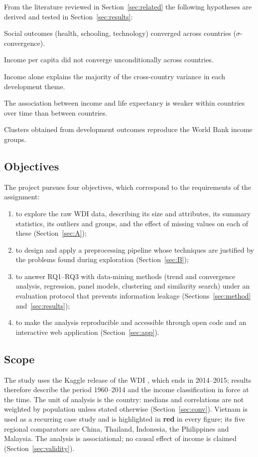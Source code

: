 \documentclass[11pt,a4paper]{article}
\begin{document}
From the literature reviewed in Section~\ref{sec:related} the following hypotheses are derived and tested in Section~\ref{sec:results}:
\begin{description}[leftmargin=1.2cm,style=nextline]
\item[H1] Social outcomes (health, schooling, technology) converged across countries ($\sigma$-convergence).
\item[H2] Income per capita did not converge unconditionally across countries.
\item[H3] Income alone explains the majority of the cross-country variance in each development theme.
\item[H4] The association between income and life expectancy is weaker within countries over time than between countries.
\item[H5] Clusters obtained from development outcomes reproduce the World Bank income groups.
\end{description}

\subsection{Objectives}
The project pursues four objectives, which correspond to the requirements of the assignment:
\begin{enumerate}
\item to explore the raw WDI data, describing its size and attributes, its summary statistics, its outliers and groups, and the effect of missing values on each of these (Section~\ref{sec:A});
\item to design and apply a preprocessing pipeline whose techniques are justified by the problems found during exploration (Section~\ref{sec:B});
\item to answer RQ1--RQ3 with data-mining methods (trend and convergence analysis, regression, panel models, clustering and similarity search) under an evaluation protocol that prevents information leakage (Sections~\ref{sec:method} and~\ref{sec:results});
\item to make the analysis reproducible and accessible through open code and an interactive web application (Section~\ref{sec:app}).
\end{enumerate}

\subsection{Scope}
The study uses the Kaggle release of the WDI \cite{kaggle}, which ends in 2014--2015; results therefore describe the period 1960--2014 and the income classification in force at the time. The unit of analysis is the country: medians and correlations are not weighted by population unless stated otherwise (Section~\ref{sec:conv}). Vietnam is used as a recurring case study and is highlighted in \textcolor{vn}{\textbf{red}} in every figure; its five regional comparators are China, Thailand, Indonesia, the Philippines and Malaysia. The analysis is associational; no causal effect of income is claimed (Section~\ref{sec:validity}).
\end{document}

